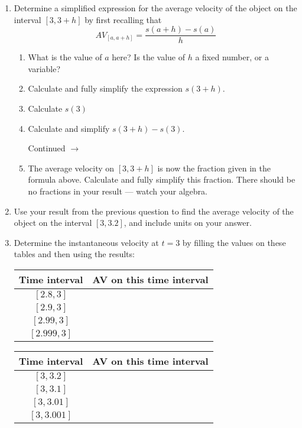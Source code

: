 \documentclass[11pt]{article}
\def\ra{\rightarrow}
\def\pageturn{\vfill 
\begin{flushright}
	\begin{small}
		Continued $\ra$
	\end{small}
\end{flushright} \newpage}
\begin{document}
\begin{enumerate}

\item Determine a simplified expression for the average velocity of the object on the interval $[3, 3+h]$ by first recalling that 
\[ AV_{[a,a + h]} = \frac{s(a + h) - s(a)}{h} \]
	\begin{enumerate}
		\item What is the value of $a$ here? Is the value of $h$ a fixed number, or a variable? 
		
		\vspace{0.5in}
		
		\item Calculate and fully simplify the expression $s(3+h)$. 
		
		\vspace{1in}
		
		\item Calculate $s(3)$ 
		
		\vspace{0.5in}
		
		\item Calculate and simplify $s(3+h) - s(3)$. 
		
		\pageturn
		
		\item The average velocity on $[3, 3+h]$ is now the fraction given in the formula above. Calculate and fully simplify this fraction. There should be no fractions in your result --- watch your algebra. 
	\end{enumerate}
	
	
\vspace{2in}	
	
\item Use your result from the previous question to find the average velocity of the object on the interval $[3, 3.2]$, and include units on your answer. 

\vspace{1in}


\item Determine the instantaneous velocity at $t=3$ by filling the values on these tables and then using the results: 

\begin{center}
	\begin{tabular}{c|c}
	Time interval & AV on this time interval \\ \hline
	$[2.8, 3]$ &  \\
	$[2.9, 3]$ &  \\
	$[2.99, 3]$ &  \\
	$[2.999, 3]$ &  \\
	\end{tabular}
	\qquad 
	\begin{tabular}{c|c}
	Time interval & AV on this time interval \\ \hline
	$[3, 3.2]$ &  \\
	$[3, 3.1]$ &  \\
	$[3, 3.01]$ &  \\
	$[3, 3.001]$ &  \\
	\end{tabular}	
\end{center}



\end{enumerate}
\end{document}
